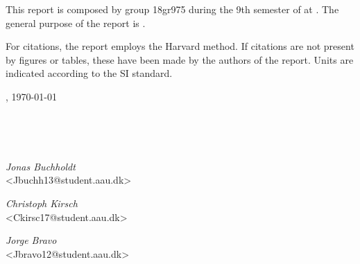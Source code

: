 This report is composed by group 18gr975 during the 9th semester of \projectFaculty{} at \AAU{}. The general purpose of the report is  \textit{\projectTheme}. 

For citations, the report employs the Harvard method. If citations are not present by figures or tables, these have been made by the authors of the report. Units are indicated according to the SI standard.


\vspace{\baselineskip}\hfill \AAU, \today
\vfill\noindent
\begin{center}
\begin{minipage}[b]{0.45\textwidth}
 \centering
  \textit{}\\
 {}
\end{minipage}
\hspace{0.3cm}
\begin{minipage}[b]{0.45\textwidth}
 \centering
  \textit{}\\
 {}
\end{minipage}
\end{center}
\vspace{1\baselineskip}
\begin{center}
\begin{minipage}[b]{0.45\textwidth}
 \centering
  \textit{Jonas Buchholdt}\\
 {\footnotesize <Jbuchh13@student.aau.dk>}
\end{minipage}
\hspace{0.3cm}
\begin{minipage}[b]{0.45\textwidth}
 \centering
  \textit{Christoph Kirsch}\\
 {\footnotesize <Ckirsc17@student.aau.dk>}
\end{minipage}
\vfill\noindent
\begin{minipage}[b]{0.45\textwidth}
 \centering
  \textit{Jorge Bravo}\\
 {\footnotesize <Jbravo12@student.aau.dk>}
\end{minipage}
\end{center}

